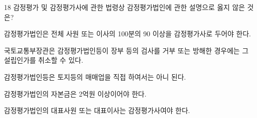 \begin{question}{18}
감정평가 및 감정평가사에 관한 법령상 감정평가법인에 관한 설명으로 옳지 않은 것은?
\begin{choices}
  \item 감정평가법인은 전체 사원 또는 이사의 100분의 90 이상을 감정평가사로 두어야 한다.
  \item 국토교통부장관은 감정평가법인등이 장부 등의 검사를 거부 또는 방해한 경우에는 그 설립인가를 취소할 수 있다.
  \item 감정평가법인등은 토지등의 매매업을 직접 하여서는 아니 된다.
  \item 감정평가법인의 자본금은 2억원 이상이어야 한다.
  \item 감정평가법인의 대표사원 또는 대표이사는 감정평가사여야 한다.
\end{choices}
\end{question}

